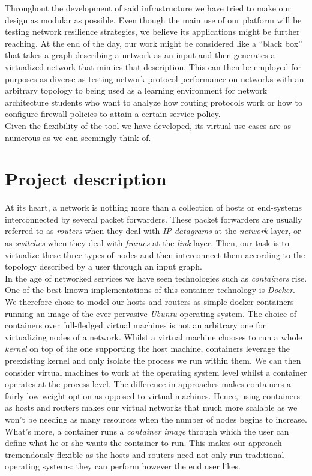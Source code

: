 \documentclass[12pt]{article}
\begin{document}
        Throughout the development of said infrastructure we have tried to make our design as modular as possible. Even though the main use of our platform will be testing network resilience strategies, we believe its applications might be further reaching. At the end of the day, our work might be considered like a ``black box'' that takes a graph describing a network as an input and then generates a virtualized network that mimics that description. This can then be employed for purposes as diverse as testing network protocol performance on networks with an arbitrary topology to being used as a learning environment for network architecture students who want to analyze how routing protocols work or how to configure firewall policies to attain a certain service policy.\\

        Given the flexibility of the tool we have developed, its virtual use cases are as numerous as we can seemingly think of.\\

    \section{Project description}
        At its heart, a network is nothing more than a collection of hosts or end-systems interconnected by several packet forwarders. These packet forwarders are usually referred to as \textit{routers} when they deal with \textit{IP datagrams} at the \textit{network} layer, or as \textit{switches} when they deal with \textit{frames} at the \textit{link} layer. Then, our task is to virtualize these three types of nodes and then interconnect them according to the topology described by a user through an input graph.\\

        In the age of networked services we have seen technologies such as \textit{containers} rise. One of the best known implementations of this container technology is \textit{Docker}. We therefore chose to model our hosts and routers as simple docker containers running an image of the ever pervasive \textit{Ubuntu} operating system. The choice of containers over full-fledged virtual machines is not an arbitrary one for virtualizing nodes of a network. Whilst a virtual machine chooses to run a whole \textit{kernel} on top of the one supporting the host machine, containers leverage the preexisting kernel and only isolate the process we run within them. We can then consider virtual machines to work at the operating system level whilst a container operates at the process level. The difference in approaches makes containers a fairly low weight option as opposed to virtual machines. Hence, using containers as hosts and routers makes our virtual networks that much more scalable as we won't be needing as many resources when the number of nodes begins to increase. What's more, a container runs a \textit{container image} through which the user can define what he or she wants the container to run. This makes our approach tremendously flexible as the hosts and routers need not only run traditional operating systems: they can perform however the end user likes.\\
\end{document}
